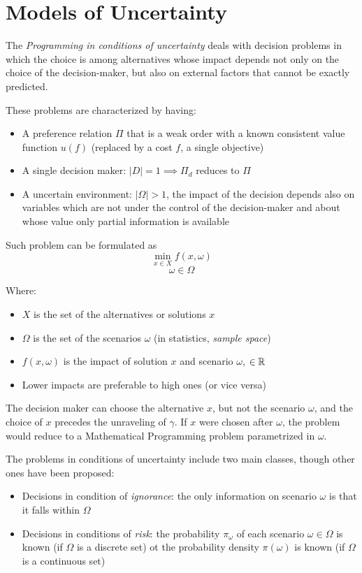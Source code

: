 \chapter{Models of Uncertainty}
\label{ch:uncertainty}

The \textit{Programming in conditions of uncertainty} deals with decision problems in which the choice is among alternatives whose impact depends not only on the choice of the decision-maker, but also on external factors that cannot be exactly predicted.

These problems are characterized by having:
\begin{itemize}
	\item A preference relation $\Pi$ that is a weak order with a known consistent value function $u(f)$ (replaced by a cost $f$, a single objective)
	
	\item A single decision maker: $|D| = 1 \implies \Pi_d$ reduces to $\Pi$
	
	\item A uncertain environment: $|\Omega| > 1$, the impact of the decision depends also on variables which are not under the control of the decision-maker and about whose value only partial information is available
\end{itemize}

Such problem can be formulated as
$$ \min_{x \in X} f(x, \omega) $$
$$ \omega \in \Omega $$

Where:
\begin{itemize}
	\item $X$ is the set of the alternatives or solutions $x$ 
	
	\item $\Omega$ is the set of the scenarios $\omega$ (in statistics, \textit{sample space})
	
	\item $f(x, \omega)$ is the impact of solution $x$ and scenario $\omega$, $\in \operatorname{\mathbb{R}}$
	
	\item Lower impacts are preferable to high ones (or vice versa)
\end{itemize}

The decision maker can choose the alternative $x$, but not the scenario $\omega$, and the choice of $x$ precedes the unraveling of $\gamma$. If $x$ were chosen after $\omega$, the problem would reduce to a Mathematical Programming problem parametrized in $\omega$.

The problems in conditions of uncertainty include two main classes, though other ones have been proposed: 
\begin{itemize}
	\item Decisions in condition of \textit{ignorance}: the only information on scenario $\omega$ is that it falls within $\Omega$
	
	\item Decisions in conditions of \textit{risk}: the probability $\pi_\omega$ of each scenario $\omega \in \Omega$ is known (if $\Omega$ is a discrete set) ot the probability density $\pi (\omega)$ is known (if $\Omega$ is a continuous set)
\end{itemize}


